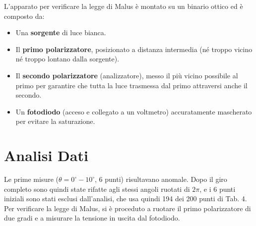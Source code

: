 \documentclass[10pt,twocolumn]{article}
\begin{document}
\begin{figure}[H]
{
 }
\end{figure}
    L'apparato per verificare la legge di Malus è montato su un binario ottico ed è composto da:
\begin{itemize}
    \item Una \textbf{sorgente} di luce bianca.
    \item Il \textbf{primo polarizzatore}, posizionato a distanza intermedia (né troppo vicino né troppo lontano dalla sorgente).
    \item Il \textbf{secondo polarizzatore} (analizzatore), messo il più vicino possibile al primo per garantire che tutta la luce trasmessa dal primo attraversi anche il secondo.
    \item Un \textbf{fotodiodo} (acceso e collegato a un voltmetro) accuratamente mascherato per evitare la saturazione. 
\end{itemize}

    \section{Analisi Dati}
    Le prime misure ($\theta = 0^\circ - 10^\circ$, 6 punti) risultavano anomale. Dopo il giro completo sono quindi state rifatte agli stessi angoli ruotati di $2\pi$, e i 6 punti iniziali sono stati esclusi dall’analisi, che usa quindi 194 dei 200 punti di Tab. 4.
    Per verificare la legge di Malus, si è proceduto a ruotare il primo polarizzatore di due gradi e a misurare la tensione in uscita dal fotodiodo.
\end{document}
